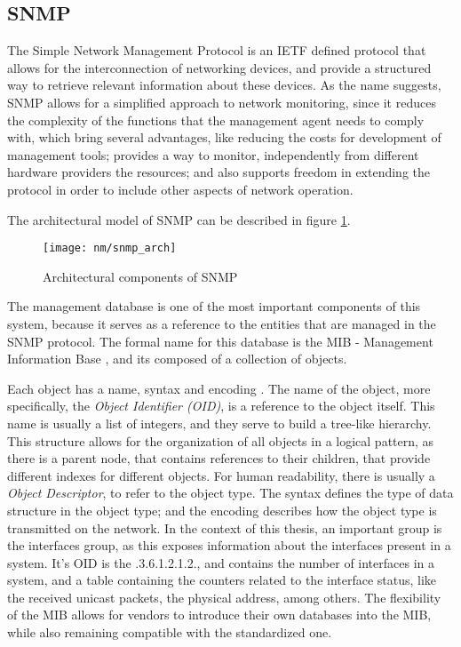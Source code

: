 \subsection {SNMP}

The Simple Network Management Protocol is an IETF defined protocol that allows for the interconnection of networking devices, and provide a structured way to retrieve relevant information about these devices. As the name suggests,
SNMP allows for a simplified approach to network monitoring, since it reduces the complexity of the functions that the management agent needs to comply with, which bring several advantages, like reducing
the costs for development of management tools; provides a way to monitor, independently from different hardware providers the resources; and also supports freedom in extending the protocol in order to include other aspects of 
network operation. \cite{CITE - RFC 1157} %
\par  The architectural model of SNMP can be described in figure \ref{fig:snmp}.
    
\begin{figure} [!htbp]
    \centering
    \texttt{[image: nm/snmp\_arch]}
    \caption{Architectural components of SNMP}
    \label{fig:snmp}
\end{figure}

The management database is one of the most important components of this system, because it serves as a reference to the entities that are managed in the SNMP protocol. The formal name for this database is the MIB - Management 
Information Base \cite {CITE - RFC 1155}, and its composed of a collection of objects.

\par Each object has a name, syntax and encoding \cite {CITE - RFC 1156}. The name of the object, more specifically, the \textit {Object Identifier (OID)}, is a reference to the object itself. This name is usually a 
list of integers, and they serve to build a tree-like hierarchy. This structure allows for the organization of all objects in a logical pattern, as there is a parent node, that contains references to their children, 
that provide different indexes for different objects. For human readability, there is usually a \textit {Object Descriptor}, to refer to the object type. The syntax defines the type of data structure in the object type; and 
the encoding describes how the object type is transmitted on the network. In the context of this thesis, an important group is the interfaces group, as this exposes information about the interfaces present in a system. It's OID 
is the .3.6.1.2.1.2., and contains the number of interfaces in a system, and a table containing the counters related to the interface status, like the received unicast packets, the physical address, among others. The flexibility of
the MIB allows for vendors to introduce their own databases into the MIB, while also remaining compatible with the standardized one.

